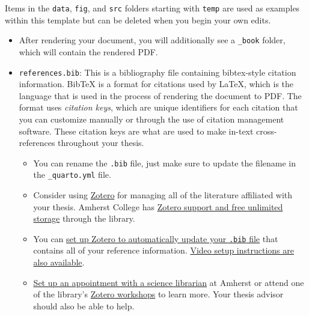 \documentclass[
  11pt,
  letterpaper,
  twoside]{report}
\providecommand{\tightlist}{%
  \setlength{\itemsep}{0pt}\setlength{\parskip}{0pt}}\usepackage{longtable,booktabs,array}
\begin{document}
\begin{tcolorbox}[enhanced jigsaw, coltitle=black, leftrule=.75mm, rightrule=.15mm, breakable, titlerule=0mm, bottomrule=.15mm, left=2mm, colbacktitle=quarto-callout-note-color!10!white, arc=.35mm, toprule=.15mm, title=\textcolor{quarto-callout-note-color}{\faInfo}\hspace{0.5em}{Note}, toptitle=1mm, colback=white, bottomtitle=1mm, opacitybacktitle=0.6, opacityback=0, colframe=quarto-callout-note-color-frame]

Items in the \texttt{data}, \texttt{fig}, and \texttt{src} folders
starting with \texttt{temp} are used as examples within this template
but can be deleted when you begin your own edits.

\end{tcolorbox}

\begin{itemize}
\item
  After rendering your document, you will additionally see a
  \texttt{\_book} folder, which will contain the rendered PDF.
\item
  \texttt{references.bib}: This is a bibliography file containing
  bibtex-style citation information. BibTeX is a format for citations
  used by LaTeX, which is the language that is used in the process of
  rendering the document to PDF. The format uses \emph{citation keys},
  which are unique identifiers for each citation that you can customize
  manually or through the use of citation management software. These
  citation keys are what are used to make in-text cross-references
  throughout your thesis.

  \begin{itemize}
  \tightlist
  \item
    You can rename the \texttt{.bib} file, just make sure to update the
    filename in the \texttt{\_quarto.yml} file.
  \item
    Consider using \href{https://www.zotero.org/support/}{Zotero} for
    managing all of the literature affiliated with your thesis. Amherst
    College has
    \href{https://libguides.amherst.edu/citation/zotero}{Zotero support
    and free unlimited storage} through the library.
  \item
    You can
    \href{https://libguides.rhul.ac.uk/referencing/Zoterolatex}{set up
    Zotero to automatically update your \texttt{.bib} file} that
    contains all of your reference information.
    \href{https://guides.library.yale.edu/bibtex/zotero-and-latex}{Video
    setup instructions are also available}.
  \item
    \href{https://libguides.amherst.edu/subjectlibrarians\#s-lg-box-31290705}{Set
    up an appointment with a science librarian} at Amherst or attend one
    of the library's
    \href{https://libguides.amherst.edu/c.php?g=959622&p=6928473\#s-lg-box-22237086}{Zotero
    workshops} to learn more. Your thesis advisor should also be able to
    help.
  \end{itemize}
\end{itemize}
\end{document}
